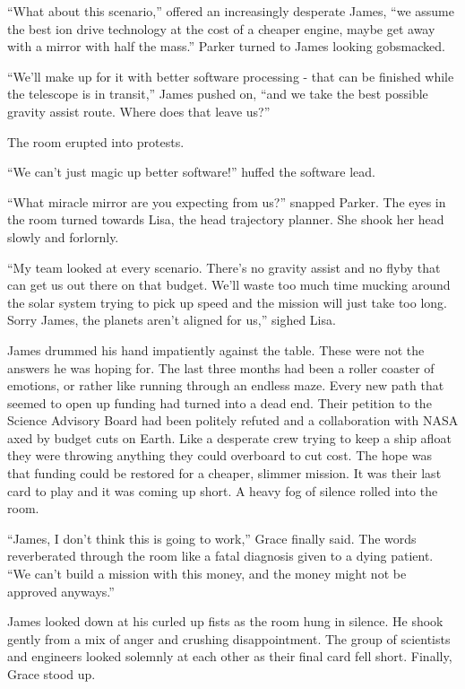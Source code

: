 \documentclass[12pt]{article} %
\begin{document}
``What about this scenario,'' offered an increasingly desperate James, ``we assume the best ion drive technology at the cost of a cheaper engine, maybe get away with a mirror with half the mass.'' Parker turned to James looking gobsmacked.

``We'll make up for it with better software processing - that can be finished while the telescope is in transit,'' James pushed on, ``and we take the best possible gravity assist route. Where does that leave us?''

The room erupted into protests.

``We can't just magic up better software!'' huffed the software lead.

``What miracle mirror are you expecting from us?'' snapped Parker. The eyes in the room turned towards Lisa, the head trajectory planner. She shook her head slowly and forlornly.

``My team looked at every scenario. There's no gravity assist and no flyby that can get us out there on that budget. We'll waste too much time mucking around the solar system trying to pick up speed and the mission will just take too long. Sorry James, the planets aren't aligned for us,'' sighed Lisa.

James drummed his hand impatiently against the table. These were not the answers he was hoping for. The last three months had been a roller coaster of emotions, or rather like running through an endless maze. Every new path that seemed to open up funding had turned into a dead end. Their petition to the Science Advisory Board had been politely refuted and a collaboration with NASA axed by budget cuts on Earth. Like a desperate crew trying to keep a ship afloat they were throwing anything they could overboard to cut cost. The hope was that funding could be restored for a cheaper, slimmer mission. It was their last card to play and it was coming up short. A heavy fog of silence rolled into the room.

``James, I don't think this is going to work,'' Grace finally said. The words reverberated through the room like a fatal diagnosis given to a dying patient. ``We can't build a mission with this money, and the money might not be approved anyways.''

James looked down at his curled up fists as the room hung in silence. He shook gently from a mix of anger and crushing disappointment. The group of scientists and engineers looked solemnly at each other as their final card fell short. Finally, Grace stood up.
\end{document}
